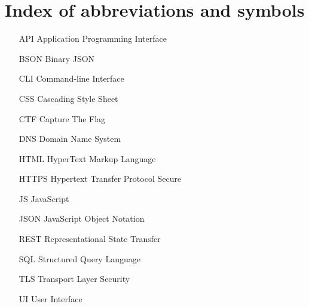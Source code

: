 
\chapter{Index of abbreviations and symbols}

\begin{itemize}
	\item[API] Application Programming Interface
	\item[BSON] Binary JSON
	\item[CLI] Command-line Interface
	\item[CSS] Cascading Style Sheet
	\item[CTF] Capture The Flag
	\item[DNS] Domain Name System
	\item[HTML] HyperText Markup Language
	\item[HTTPS] Hypertext Transfer Protocol Secure
	\item[JS] JavaScript
	\item[JSON] JavaScript Object Notation
	\item[REST] Representational State Transfer
	\item[SQL] Structured Query Language
	\item[TLS] Transport Layer Security
	\item[UI] User Interface
\end{itemize}
